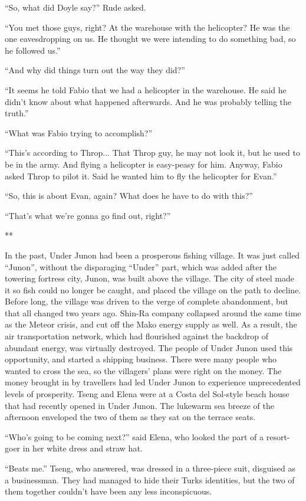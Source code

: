 \documentclass[oneside]{book}
\begin{document}
“So, what did Doyle say?” Rude asked.

“You met those guys, right? At the warehouse with the helicopter? He was the one eavesdropping on us. He thought we were intending to do something bad, so he followed us.”

“And why did things turn out the way they did?”

“It seems he told Fabio that we had a helicopter in the warehouse. He said he didn’t know about what happened afterwards. And he was probably telling the truth.”

“What was Fabio trying to accomplish?”

“This’s according to Throp... That Throp guy, he may not look it, but he used to be in the army. And flying a helicopter is easy-peasy for him. Anyway, Fabio asked Throp to pilot it. Said he wanted him to fly the helicopter for Evan.”

“So, this is about Evan, again? What does he have to do with this?”

“That’s what we’re gonna go find out, right?”

**

In the past, Under Junon had been a prosperous fishing village. It was just called “Junon”, without the disparaging “Under” part, which was added after the towering fortress city, Junon, was built above the village. The city of steel made it so fish could no longer be caught, and placed the village on the path to decline. Before long, the village was driven to the verge of complete abandonment, but that all changed two years ago. Shin-Ra company collapsed around the same time as the Meteor crisis, and cut off the Mako energy supply as well. As a result, the air transportation network, which had flourished against the backdrop of abundant energy, was virtually destroyed. The people of Under Junon used this opportunity, and started a shipping business. There were many people who wanted to cross the sea, so the villagers’ plans were right on the money. The money brought in by travellers had led Under Junon to experience unprecedented levels of prosperity. Tseng and Elena were at a Costa del Sol-style beach house that had recently opened in Under Junon. The lukewarm sea breeze of the afternoon enveloped the two of them as they sat on the terrace seats.

“Who’s going to be coming next?” said Elena, who looked the part of a resort-goer in her white dress and straw hat.

“Beats me.” Tseng, who answered, was dressed in a three-piece suit, disguised as a businessman. They had managed to hide their Turks identities, but the two of them together couldn’t have been any less inconspicuous.
\end{document}
